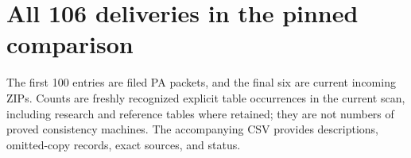 \documentclass[11pt,a4paper]{article}
\begin{document}
\clearpage
\section{All 106 deliveries in the pinned comparison}\label{app:packets}
The first 100 entries are filed PA packets, and the final six are current
incoming ZIPs. Counts are freshly recognized explicit table occurrences in
the current scan, including research and reference tables where retained;
they are not numbers of proved consistency machines. The accompanying CSV
provides descriptions, omitted-copy records, exact sources, and status.

\end{document}
